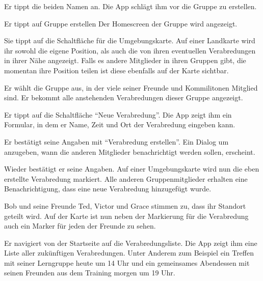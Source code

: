 \documentclass[parskip=full,11pt]{scrartcl}
\begin{document}
{Er tippt die beiden Namen an.}
{Die App schlägt ihm vor die Gruppe zu erstellen.}

{Er tippt auf Gruppe erstellen}
{Der Homescreen der Gruppe wird angezeigt.} %

{Sie tippt auf die Schaltfläche für die Umgebungskarte.}
{Auf einer Landkarte wird ihr sowohl die eigene Position, als auch die von ihren
eventuellen Verabredungen in ihrer Nähe angezeigt.
Falls es andere Mitglieder in ihren Gruppen gibt, die momentan
ihre Position teilen ist diese ebenfalls auf der Karte sichtbar.}


{Er wählt die Gruppe aus, in der viele seiner Freunde und Kommilitonen Mitglied sind.}
{Er bekommt alle anstehenden Verabredungen dieser Gruppe angezeigt.}

{Er tippt auf die Schaltfläche \enquote{Neue Verabredung}.}
{Die App zeigt ihm ein Formular, in dem er Name, Zeit und Ort der Verabredung eingeben kann.}

{Er bestätigt seine Angaben mit \enquote{Verabredung erstellen}.}
{Ein Dialog um anzugeben, wann die anderen Mitglieder benachrichtigt werden sollen, erscheint.}

{Wieder bestätigt er seine Angaben.}
{Auf einer Umgebungskarte wird nun die eben erstellte Verabredung markiert.
Alle anderen Gruppenmitglieder erhalten eine Benachrichtigung,
dass eine neue Verabredung hinzugefügt wurde.}

{Bob und seine Freunde Ted, Victor und Grace stimmen zu, dass ihr Standort geteilt wird.}
{Auf der Karte ist nun neben der Markierung für die Verabredung auch ein Marker für
jeden der Freunde zu sehen.}


{Er navigiert von der Startseite auf die Verabredungsliste.}
{Die App zeigt ihm eine Liste aller zukünftigen Verabredungen.
Unter Anderem zum Beispiel ein Treffen mit seiner Lerngruppe heute um 14 Uhr
und ein gemeinsames Abendessen mit seinen Freunden aus dem Training morgen um 19 Uhr.}
\end{document}
